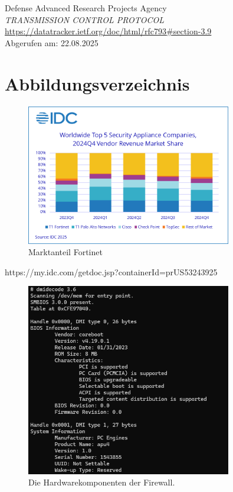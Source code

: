 \documentclass[12pt]{scrreprt}
\begin{document}
\begin{thebibliography}{99}
Defense Advanced Research Projects Agency\\
\emph{TRANSMISSION CONTROL PROTOCOL} \\
\url{https://datatracker.ietf.org/doc/html/rfc793#section-3.9}\\
Abgerufen am: 22.08.2025

\chapter{Abbildungsverzeichnis}

	 \begin{figure}[h!]
	\centering
	\includegraphics[width=0.8\textwidth]{Fortinet_Marktanteile.png}
	\caption{Marktanteil Fortinet}
	\label{fig:ER-Modell}
\end{figure}
https://my.idc.com/getdoc.jsp?containerId=prUS53243925


\begin{figure}[htbp]
	\centering
	\includegraphics[width=0.8\textwidth]{opnsense-hardware.png}
	\caption{Die Hardwarekomponenten der Firewall.}
	\label{fig:hardware-apu4} %
\end{figure}


\end{thebibliography}
\end{document}
